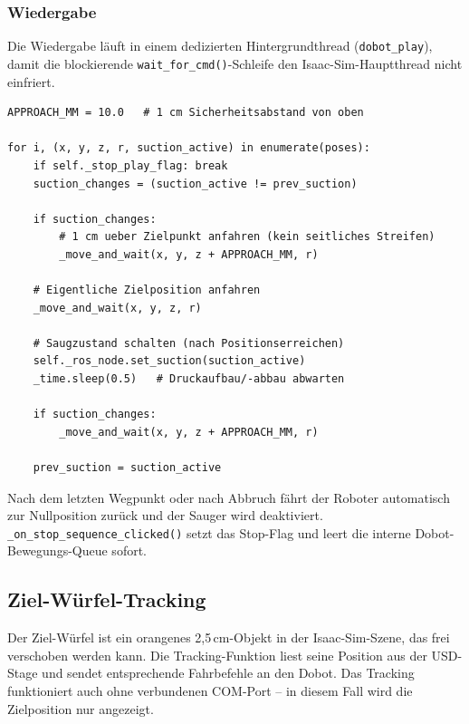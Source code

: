 \documentclass[11pt,a4paper]{article}
\begin{document}
\subsubsection{Wiedergabe}

Die Wiedergabe läuft in einem dedizierten Hintergrundthread
(\texttt{dobot\_play}), damit die blockierende
\texttt{wait\_for\_cmd()}-Schleife den Isaac-Sim-Hauptthread
nicht einfriert.

\begin{lstlisting}[caption={Kernlogik \_play\_sequence\_thread() (vereinfacht)}]
APPROACH_MM = 10.0   # 1 cm Sicherheitsabstand von oben

for i, (x, y, z, r, suction_active) in enumerate(poses):
    if self._stop_play_flag: break
    suction_changes = (suction_active != prev_suction)

    if suction_changes:
        # 1 cm ueber Zielpunkt anfahren (kein seitliches Streifen)
        _move_and_wait(x, y, z + APPROACH_MM, r)

    # Eigentliche Zielposition anfahren
    _move_and_wait(x, y, z, r)

    # Saugzustand schalten (nach Positionserreichen)
    self._ros_node.set_suction(suction_active)
    _time.sleep(0.5)   # Druckaufbau/-abbau abwarten

    if suction_changes:
        _move_and_wait(x, y, z + APPROACH_MM, r)

    prev_suction = suction_active
\end{lstlisting}

Nach dem letzten Wegpunkt oder nach Abbruch fährt der Roboter
automatisch zur Nullposition zurück und der Sauger wird deaktiviert.
\texttt{\_on\_stop\_sequence\_clicked()} setzt das Stop-Flag und
leert die interne Dobot-Bewegungs-Queue sofort.

\subsection{Ziel-Würfel-Tracking}
\label{sec:tracking}

Der Ziel-Würfel ist ein orangenes 2,5\,cm-Objekt in der Isaac-Sim-Szene,
das frei verschoben werden kann. Die Tracking-Funktion liest seine
Position aus der USD-Stage und sendet entsprechende Fahrbefehle an
den Dobot. Das Tracking funktioniert auch ohne verbundenen COM-Port --
in diesem Fall wird die Zielposition nur angezeigt.
\end{document}
